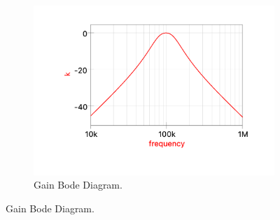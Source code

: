 \begin{figure}[H]
    \centering

    \begin{subfigure}[b]{0.5\textwidth}
        \centering
        \includegraphics[width=\textwidth]{Images/Qucs_BPgain.png}
        \caption{Gain Bode Diagram.}
        \label{fig:Qucs_BPgain}
    \end{subfigure}%


\end{figure}
